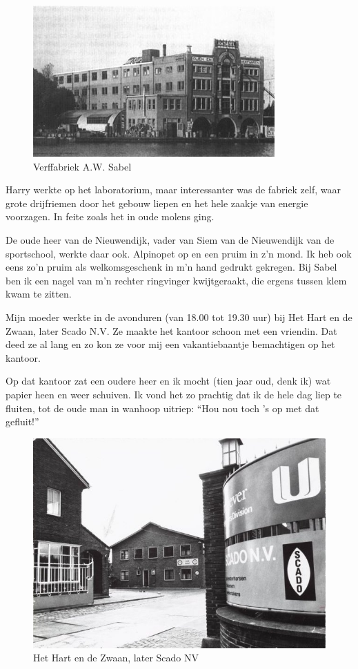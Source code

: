 \documentclass[12pt,twoside, openright]{memoir}
\begin{document}
\begin{figure}
\centering
\includegraphics[width=\textwidth]{img/ch32/sabel}
\caption*{\footnotesize Verffabriek A.W. Sabel}
\end{figure}

Harry werkte op het laboratorium, maar interessanter was de fabriek zelf, waar grote drijfriemen door het gebouw liepen en het hele zaakje van energie voorzagen. In feite zoals het in oude molens ging.

De oude heer van de Nieuwendijk, vader van Siem van de Nieuwendijk van de sportschool, werkte daar ook. Alpinopet op en een pruim in z’n mond. Ik heb ook eens zo’n pruim als welkomsgeschenk in m’n hand gedrukt gekregen. Bij Sabel ben ik een nagel van m’n rechter ringvinger kwijtgeraakt, die ergens tussen klem kwam te zitten.

Mijn moeder werkte in de avonduren (van 18.00 tot 19.30 uur) bij Het Hart en de Zwaan, later Scado N.V. Ze maakte het kantoor schoon met een vriendin. Dat deed ze al lang en zo kon ze voor mij een vakantiebaantje bemachtigen op het kantoor. 

Op dat kantoor zat een oudere heer en ik mocht (tien jaar oud, denk ik) wat papier heen en weer schuiven. Ik vond het zo prachtig dat ik de hele dag liep te fluiten, tot de oude man in wanhoop uitriep: ``Hou nou toch ’s op met dat gefluit!''

\begin{figure}
\centering
\includegraphics[width=\textwidth]{img/197scado}
\caption*{\footnotesize Het Hart en de Zwaan, later Scado NV}
\end{figure}
\end{document}
